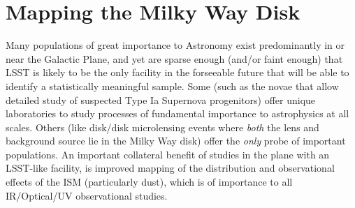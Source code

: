 %
%
%
%
%
%
%

\section{Mapping the Milky Way Disk}
\def\secname{MW_Disk}\label{sec:\secname} %





Many populations of great importance to Astronomy exist predominantly
in or near the Galactic Plane, and yet are sparse enough (and/or faint
enough) that LSST is likely to be the only facility in the forseeable
future that will be able to identify a statistically meaningful
sample. Some (such as the novae that allow detailed study of suspected
Type Ia Supernova progenitors) offer unique laboratories to study
processes of fundamental importance to astrophysics at all
scales. Others (like disk/disk microlensing events where {\it both}
the lens and background source lie in the Milky Way disk) offer the
{\it only} probe of important populations. An important collateral
benefit of studies in the plane with an LSST-like facility, is
improved mapping of the distribution and observational effects of the
ISM (particularly dust), which is of importance to all IR/Optical/UV
observational studies.


